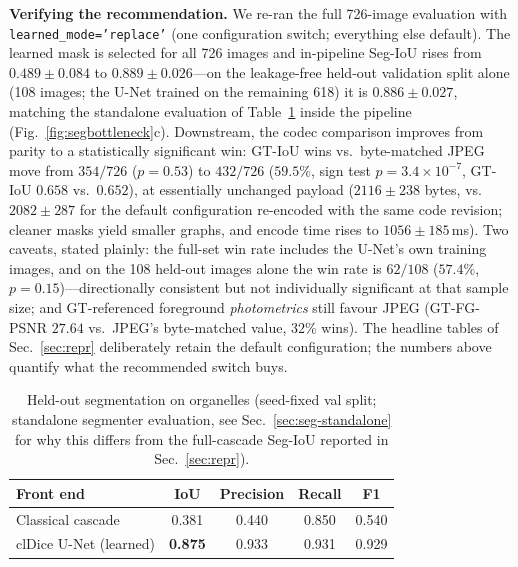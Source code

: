 \documentclass[10pt,a4paper]{article}
\begin{document}
\noindent\textbf{Verifying the recommendation.} We re-ran the full
726-image evaluation with \texttt{learned\_mode='replace'} (one
configuration switch; everything else default). The learned mask is selected
for all 726 images and in-pipeline Seg-IoU rises from $0.489\pm0.084$ to
$0.889\pm0.026$---on the leakage-free held-out validation split alone (108
images; the U-Net trained on the remaining 618) it is $0.886\pm0.027$,
matching the standalone evaluation of Table~\ref{tab:seg} inside the
pipeline (Fig.~\ref{fig:segbottleneck}c). Downstream, the codec comparison
improves from parity to a statistically significant win: GT-IoU wins vs.\
byte-matched JPEG move from $354/726$ ($p=0.53$) to $432/726$ ($59.5\%$,
sign test $p=3.4\times10^{-7}$, GT-IoU $0.658$ vs.\ $0.652$), at essentially
unchanged payload ($2116\pm238$ bytes, vs.\ $2082\pm287$ for the default
configuration re-encoded with the same code revision; cleaner masks yield
smaller graphs, and encode time rises to $1056\pm185$\,ms). Two caveats,
stated plainly: the full-set win rate includes the U-Net's own training
images, and on the 108 held-out images alone the win rate is $62/108$
($57.4\%$, $p=0.15$)---directionally consistent but not individually
significant at that sample size; and GT-referenced foreground
\emph{photometrics} still favour JPEG (GT-FG-PSNR $27.64$ vs.\ JPEG's
byte-matched value, $32\%$ wins). The headline tables of
Sec.~\ref{sec:repr} deliberately retain the default configuration; the
numbers above quantify what the recommended switch buys.

\begin{table}[t]
\centering
\caption{Held-out segmentation on organelles (seed-fixed val split;
standalone segmenter evaluation, see Sec.~\ref{sec:seg-standalone} for why
this differs from the full-cascade Seg-IoU reported in
Sec.~\ref{sec:repr}).}
\label{tab:seg}
\setlength{\tabcolsep}{7pt}
\begin{tabular}{lcccc}
\toprule
Front end & IoU & Precision & Recall & F1\\
\midrule
Classical cascade      & 0.381 & 0.440 & 0.850 & 0.540\\
clDice U-Net (learned) & \textbf{0.875} & 0.933 & 0.931 & 0.929\\
\bottomrule
\end{tabular}
\end{table}
\end{document}
